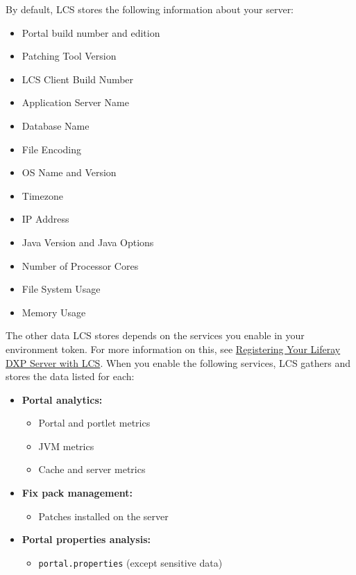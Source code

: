 By default, LCS stores the following information about your server:

\begin{itemize}
\tightlist
\item
  Portal build number and edition
\item
  Patching Tool Version
\item
  LCS Client Build Number
\item
  Application Server Name
\item
  Database Name
\item
  File Encoding
\item
  OS Name and Version
\item
  Timezone
\item
  IP Address
\item
  Java Version and Java Options
\item
  Number of Processor Cores
\item
  File System Usage
\item
  Memory Usage
\end{itemize}

The other data LCS stores depends on the services you enable in your
environment token. For more information on this, see
\href{/docs/7-0/deploy/-/knowledge_base/d/registering-your-dxp-server-with-lcs}{Registering
Your Liferay DXP Server with LCS}. When you enable the following
services, LCS gathers and stores the data listed for each:

\begin{itemize}
\item
  \textbf{Portal analytics:}

  \begin{itemize}
  \tightlist
  \item
    Portal and portlet metrics
  \item
    JVM metrics
  \item
    Cache and server metrics
  \end{itemize}
\item
  \textbf{Fix pack management:}

  \begin{itemize}
  \tightlist
  \item
    Patches installed on the server
  \end{itemize}
\item
  \textbf{Portal properties analysis:}

  \begin{itemize}
  \tightlist
  \item
    \texttt{portal.properties} (except sensitive data)
  \end{itemize}
\end{itemize}

